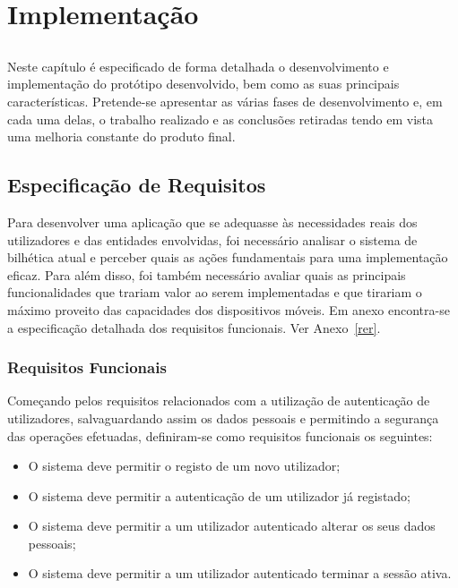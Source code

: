 \chapter{Implementação}\label{chap:implement}

\section*{}

Neste capítulo é especificado de forma detalhada o desenvolvimento e implementação do protótipo desenvolvido, bem como as suas principais características. Pretende-se apresentar as várias fases de desenvolvimento e, em cada uma delas, o trabalho realizado e as conclusões retiradas tendo em vista uma melhoria constante do produto final.

\section{Especificação de Requisitos}

Para desenvolver uma aplicação que se adequasse às necessidades reais dos utilizadores e das entidades envolvidas, foi necessário analisar o sistema de bilhética atual e perceber quais as ações fundamentais para uma implementação eficaz. Para além disso, foi também necessário avaliar quais as principais funcionalidades que trariam valor ao serem implementadas e que tirariam o máximo proveito das capacidades dos dispositivos móveis. Em anexo encontra-se a especificação detalhada dos requisitos funcionais. Ver Anexo~\ref{rer}.

\subsection{Requisitos Funcionais}

Começando pelos requisitos relacionados com a utilização de autenticação de utilizadores, salvaguardando assim os dados pessoais e permitindo a segurança das operações efetuadas, definiram-se como requisitos funcionais os seguintes:
\begin{itemize}
\item O sistema deve permitir o registo de um novo utilizador;
\item O sistema deve permitir a autenticação de um utilizador já registado;
\item O sistema deve permitir a um utilizador autenticado alterar os seus dados pessoais;
\item O sistema deve permitir a um utilizador autenticado terminar a sessão ativa.
\end{itemize}

